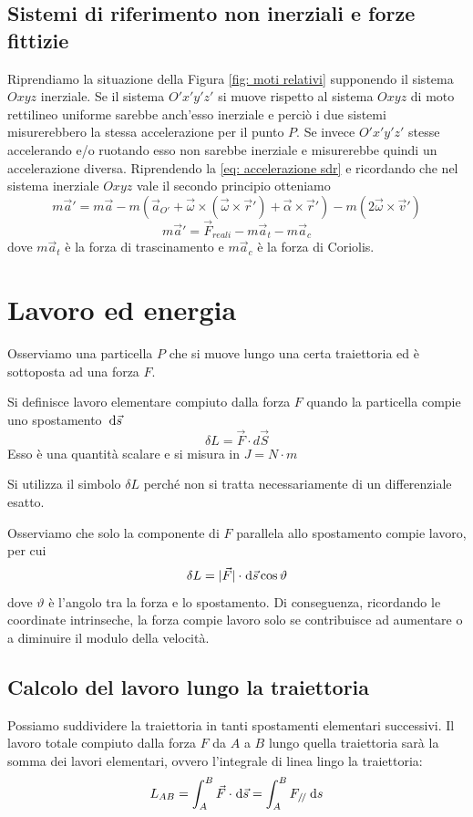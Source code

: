 \documentclass{article}
\theoremstyle{plain}
\begin{document}
\subsection{Sistemi di riferimento non inerziali e forze fittizie}
Riprendiamo la situazione della Figura \ref{fig: moti relativi} supponendo il sistema $Oxyz$ inerziale. Se il sistema $O'x'y'z'$ si muove rispetto al sistema $Oxyz$ di moto rettilineo uniforme sarebbe anch'esso inerziale e perciò i due sistemi misurerebbero la stessa accelerazione per il punto $P$. Se invece $O'x'y'z'$ stesse accelerando e/o ruotando esso non sarebbe inerziale e misurerebbe quindi un accelerazione diversa. Riprendendo la \eqref{eq: accelerazione sdr} e ricordando che nel sistema inerziale $Oxyz$ vale il secondo principio otteniamo
\[m\vec a'=m\vec a-m\left(\vec a_{O'}+\vec \omega\times \left( \vec\omega  \times \vec r '\right)+\vec \alpha\times  \vec r'\right)-m\left(2\vec \omega \times \vec v'\right)\]
\begin{equation}m\vec a'=\vec F_{reali}-m\vec a_t-m\vec a_c\end{equation}
dove $m\vec a_t$ è la forza di trascinamento e $m\vec a_c$ è la forza di Coriolis.
\section{Lavoro ed energia}
Osserviamo una particella $P$ che si muove lungo una certa traiettoria ed è sottoposta ad una forza $F$. 
\begin{boxdef}
    Si definisce lavoro elementare compiuto dalla forza $F$ quando la particella compie uno spostamento $\:\text{d} \vec s$ 
    \[\delta L=\vec F\cdot d \vec S\]
    Esso è una quantità scalare e si misura in $J=N\cdot m$
\end{boxdef}
Si utilizza il simbolo $\delta L$ perché non si tratta necessariamente di un differenziale esatto. 

Osserviamo che solo la componente di $F$ parallela allo spostamento compie lavoro, per cui 
\[\delta L=|\vec F|\cdot\! \:\text{d} \vec s\cos \vartheta\]
dove $\vartheta$ è l'angolo tra la forza e lo spostamento. Di conseguenza, ricordando le coordinate intrinseche, la forza compie lavoro solo se contribuisce ad aumentare o a diminuire il modulo della velocità.
\subsection{Calcolo del lavoro lungo la traiettoria}
Possiamo suddividere la traiettoria in tanti spostamenti elementari successivi. Il lavoro totale compiuto dalla forza $F$ da $A$ a $B$ lungo quella traiettoria sarà la somma dei lavori elementari, ovvero l'integrale di linea lingo la traiettoria:
\[L_{AB}=\int_A^B\vec F\cdot\!\:\text{d} \vec s=\int_A^B F_{/\!/} \:\text{d} s\]
\end{document}
